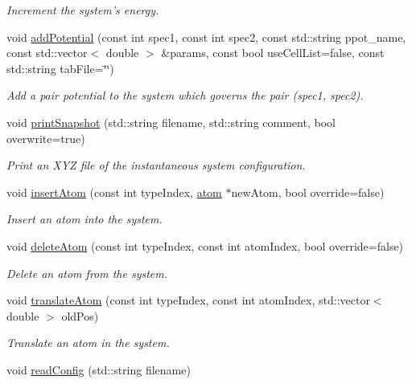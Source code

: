 \begin{DoxyCompactItemize}
\begin{DoxyCompactList}\small\item\em Increment the system's energy. \end{DoxyCompactList}\item 
void \hyperlink{classsim_system_a5abdfae81ca00a79f162c0ce2b4307c9}{add\-Potential} (const int spec1, const int spec2, const std\-::string ppot\-\_\-name, const std\-::vector$<$ double $>$ \&params, const bool use\-Cell\-List=false, const std\-::string tab\-File=\char`\"{}\char`\"{})
\begin{DoxyCompactList}\small\item\em Add a pair potential to the system which governs the pair (spec1, spec2). \end{DoxyCompactList}\item 
void \hyperlink{classsim_system_ae3096dc65acdf38cc824e507cca33370}{print\-Snapshot} (std\-::string filename, std\-::string comment, bool overwrite=true)
\begin{DoxyCompactList}\small\item\em Print an X\-Y\-Z file of the instantaneous system configuration. \end{DoxyCompactList}\item 
void \hyperlink{classsim_system_a0404e9435cc046d19b6bb990678ee069}{insert\-Atom} (const int type\-Index, \hyperlink{classatom}{atom} $\ast$new\-Atom, bool override=false)
\begin{DoxyCompactList}\small\item\em Insert an atom into the system. \end{DoxyCompactList}\item 
void \hyperlink{classsim_system_acabf4fc5b5b90bba62e1449ddb3646c6}{delete\-Atom} (const int type\-Index, const int atom\-Index, bool override=false)
\begin{DoxyCompactList}\small\item\em Delete an atom from the system. \end{DoxyCompactList}\item 
void \hyperlink{classsim_system_a22fdaceea44abd6cd021bac1ecd11890}{translate\-Atom} (const int type\-Index, const int atom\-Index, std\-::vector$<$ double $>$ old\-Pos)
\begin{DoxyCompactList}\small\item\em Translate an atom in the system. \end{DoxyCompactList}\item 
void \hyperlink{classsim_system_a3161d95bbb800d5d95a732ac5fc32b95}{read\-Config} (std\-::string filename)

\end{DoxyCompactItemize}
